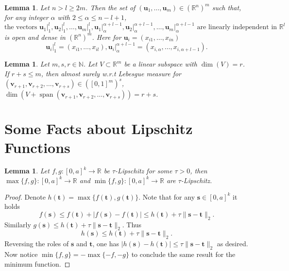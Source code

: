 \documentclass[11pt]{article}
\theoremstyle{plain}
\newtheorem{lem}[thm]{Lemma}
\theoremstyle{definition}
\DeclareMathOperator{\spann}{span}
\def\R{\mathbb{R}}
\def\N{\mathbb{N}}
\def\tt{\mathbf t}
\def\ss{\mathbf s}
\def\vv{\mathbf v}
\numberwithin{figure}{section}
\begin{document}
\begin{lem}\cite[Lemma 2.4]{GJT19}\label{lem:ap_2}
    Let $n>l\geq 2m$. Then the set of $(\mathbf u_1,\ldots,\mathbf u_m)\in(\R^{n})^m$ such that, for any integer $\alpha$ with $2\leq\alpha\leq n-l+1$, 
    \begin{equation*}
        \text{the vectors } \mathbf u_1\vert_{1}^{l}, \mathbf u_2\vert_{1}^{l},\ldots, \mathbf u_m\vert_{1}^{l}, \mathbf u_1\vert_{\alpha}^{\alpha+l-1}, \mathbf u_2\vert_{\alpha}^{\alpha+l-1},\ldots, \mathbf u_m\vert_{\alpha}^{\alpha+l-1} \text{ are linearly independent in } \R^l
    \end{equation*}
    is open and dense in $(\R^{n})^m$. Here for $\mathbf u_i=(x_{i1},\ldots,x_{in})$
    \begin{equation*}
        \mathbf u_i\vert_{1}^{l}=(x_{i1},\ldots,x_{il}), \mathbf u_i\vert_{\alpha}^{\alpha+l-1}=(x_{i,\alpha},\ldots,x_{i,\alpha+l-1}).
    \end{equation*}
\end{lem}

\begin{lem}\cite[Lemma A.6]{Gut15Jaworski}
\label{lem:Almost sure linear independence}Let $m,s,r \in\N$. Let $V\subset\mathbb{R}^{m}$ be a linear subspace
with $\dim(V)=r$. If $r+s\leq m$, then almost surely w.r.t Lebesgue
measure for $(\vv_{r+1},\vv_{r+2},\ldots,\vv_{r+s})\in([0,1]^{m})^{s}$, $\dim(V+\spann(\vv_{r+1},\vv_{r+2},\ldots,\vv_{r+s}))=r+s$.
\end{lem}

\section{Some Facts about Lipschitz Functions}

\begin{lem}\label{lem:max Lip}
Let $f,g: [0,a]^k\rightarrow \R$ be $\tau$-Lipschitz for some $\tau>0$, then $\max\{f,g\}: [0,a]^k\rightarrow \R$ and $\min\{f,g\}: [0,a]^k\rightarrow \R$ are $\tau$-Lipschitz. 
\end{lem}
\begin{proof}
    Denote $h(\tt)=\max\{f(\tt),g(\tt)\}$. Note that for any $\ss\in [0,a]^k$ it holds $$f(\ss)\leq f(\tt)+|f(\ss)-f(\tt)|\leq h(\tt)+\tau\|\ss-\tt\|_2.$$
    Similarly $g(\ss)\leq  h(\tt)+\tau\|\ss-\tt\|_2.$
    Thus 
    $$h(\ss)\leq h(\tt)+\tau\|\ss-\tt\|_2.$$
    Reversing the roles of $\ss$ and $\tt$, one has $|h(\ss)-h(\tt)|\leq \tau\|\ss-\tt\|_2$ as desired. Now notice  $\min\{f,g\}=-\max\{-f,-g\}$ to conclude the same result for the minimum function.  
\end{proof}
\end{document}
